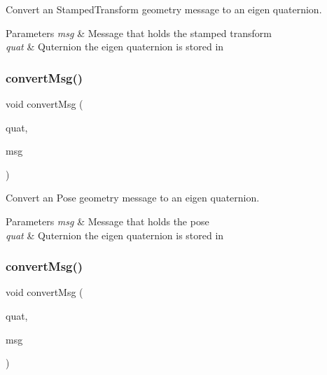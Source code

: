 Convert an Stamped\+Transform geometry message to an eigen quaternion. 


\begin{DoxyParams}{Parameters}
{\em msg} & Message that holds the stamped transform \\
\hline
{\em quat} & Quternion the eigen quaternion is stored in \\
\hline
\end{DoxyParams}
\mbox{\label{group__transport__controller_gadc07db93efb76fd809b67b74dd13b939}} 
\subsubsection{\texorpdfstring{convert\+Msg()}{convertMsg()}\hspace{0.1cm}{\footnotesize\ttfamily [4/13]}}
{\footnotesize\ttfamily void convert\+Msg (\begin{DoxyParamCaption}\item[{Eigen\+::\+Quaterniond \&}]{quat,  }\item[{geometry\+\_\+msgs\+::\+Pose \&}]{msg }\end{DoxyParamCaption})}



Convert an Pose geometry message to an eigen quaternion. 


\begin{DoxyParams}{Parameters}
{\em msg} & Message that holds the pose \\
\hline
{\em quat} & Quternion the eigen quaternion is stored in \\
\hline
\end{DoxyParams}
\mbox{\label{group__transport__controller_ga8257db2bb94ec53eadfe87d04b38cc0b}} 
\subsubsection{\texorpdfstring{convert\+Msg()}{convertMsg()}\hspace{0.1cm}{\footnotesize\ttfamily [5/13]}}
{\footnotesize\ttfamily void convert\+Msg (\begin{DoxyParamCaption}\item[{Eigen\+::\+Quaterniond \&}]{quat,  }\item[{geometry\+\_\+msgs\+::\+Pose\+Stamped \&}]{msg }\end{DoxyParamCaption})}



